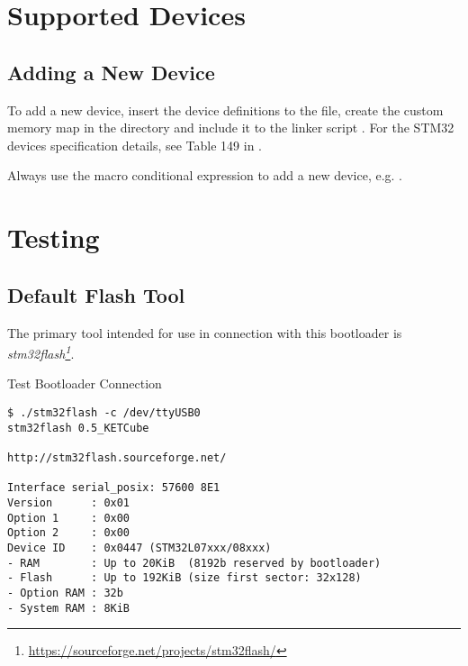 \clearpage
\section{Supported Devices}\label{sec:supportedDevices}


\subsection{Adding a New Device}

To add a new device, insert the device definitions to the  file, create the custom memory map in the  directory and include it to the linker script  . For the STM32 devices specification details, see Table 149 in \cite{STM32:AN2606}.

Always use the macro conditional expression to add a new device, e.g. .



\clearpage
\section{Testing}

\subsection{Default Flash Tool}

The primary tool intended for use in connection with this bootloader is {\it stm32flash\footnote{\url{https://sourceforge.net/projects/stm32flash/}}}.

\begin{docCodeExampleTitled}{Test Bootloader Connection}
\begin{verbatim}
$ ./stm32flash -c /dev/ttyUSB0 
stm32flash 0.5_KETCube

http://stm32flash.sourceforge.net/

Interface serial_posix: 57600 8E1
Version      : 0x01
Option 1     : 0x00
Option 2     : 0x00
Device ID    : 0x0447 (STM32L07xxx/08xxx)
- RAM        : Up to 20KiB  (8192b reserved by bootloader)
- Flash      : Up to 192KiB (size first sector: 32x128)
- Option RAM : 32b
- System RAM : 8KiB
\end{verbatim}
\end{docCodeExampleTitled}

